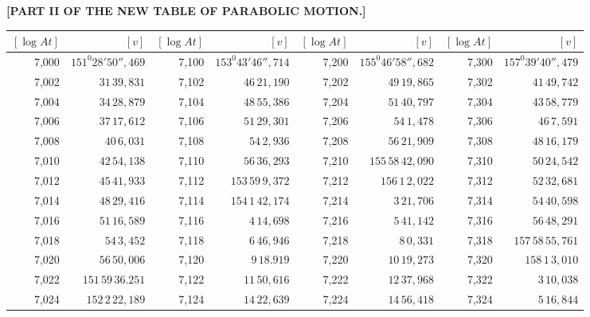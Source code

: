 \clearpage
{}
\begingroup
\centering
\fontsize{9}{9}\selectfont
\setlength{\tabcolsep}{.2pt}
\renewcommand{\arraystretch}{.9}
\setlength{\parskip}{0pt}
\textbf{[PART II OF THE NEW TABLE OF PARABOLIC MOTION.]}
\par\vspace{7pt}
\begin{tabular}{|r|r||r|r||r|r||r|r|}
\hline
\([\log At]\) & \([v]\) & \([\log At]\) & \([v]\) & \([\log At]\) & \([v]\) & \([\log At]\) & \([v]\) \\
\hline
7,000 & \(151^{0}28'50'',\!469\) & 7,100 & \(153^{0}43'46'',\!714\) & 7,200 & \(155^{0}46'58'',\!682\) & 7,300 & \(157^{0}39'40'',\!479\) \\[1pt]
7,002 & \(31\,39,\!831\) & 7,102 & \(46\,21,\!190\) & 7,202 & \(49\,19,\!865\) & 7,302 & \(41\,49,\!742\) \\
7,004 & \(34\,28,\!879\) & 7,104 & \(48\,55,\!386\) & 7,204 & \(51\,40,\!797\) & 7,304 & \(43\,58,\!779\) \\
7,006 & \(37\,17,\!612\) & 7,106 & \(51\,29,\!301\) & 7,206 & \(54\,1,\!478\) & 7,306 & \(46\,7,\!591\) \\
7,008 & \(40\,6,\!031\) & 7,108 & \(54\,2,\!936\) & 7,208 & \(56\,21,\!909\) & 7,308 & \(48\,16,\!179\) \\
7,010 & \(42\,54,\!138\) & 7,110 & \(56\,36,\!293\) & 7,210 & \(155\,58\,42,\!090\) & 7,310 & \(50\,24,\!542\) \\[1pt]
7,012 & \(45\,41,\!933\) & 7,112 & \(153\,59\,9,\!372\) & 7,212 & \(156\,1\,2,\!022\) & 7,312 & \(52\,32,\!681\) \\
7,014 & \(48\,29,\!416\) & 7,114 & \(154\,1\,42,\!174\) & 7,214 & \(3\,21,\!706\) & 7,314 & \(54\,40,\!598\) \\
7,016 & \(51\,16,\!589\) & 7,116 & \(4\,14,\!698\) & 7,216 & \(5\,41,\!142\) & 7,316 & \(56\,48,\!291\) \\
7,018 & \(54\,3,\!452\) & 7,118 & \(6\,46,\!946\) & 7,218 & \(8\,0,\!331\) & 7,318 & \(157\,58\,55,\!761\) \\
7,020 & \(56\,50,\!006\) & 7,120 & \(9\,18.919\) & 7,220 & \(10\,19,\!273\) & 7,320 & \(158\,1\,3,\!010\) \\[1pt]
7,022 & \(151\,59\,36.251\) & 7,122 & \(11\,50,\!616\) & 7,222 & \(12\,37,\!968\) & 7,322 & \(3\,10,\!038\) \\
7,024 & \(152\,2\,22,\!189\) & 7,124 & \(14\,22,\!639\) & 7,224 & \(14\,56,\!418\) & 7,324 & \(5\,16,\!844\) \\

\end{tabular}
